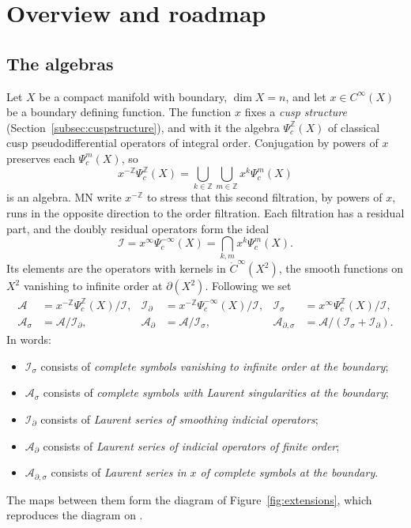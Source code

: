 \documentclass[11pt,oneside,reqno]{article}
\newcommand{\Z}{\mathbb Z}
\newcommand{\cA}{\mathcal A}
\newcommand{\cI}{\mathcal I}
\newcommand{\Is}{\mathcal I_\sigma}
\newcommand{\Id}{\mathcal I_\partial}
\newcommand{\As}{\mathcal A_\sigma}
\newcommand{\Ad}{\mathcal A_\partial}
\newcommand{\Ads}{\mathcal A_{\partial,\sigma}}
\newcommand{\Psic}{\Psi_{c}}
\newcommand{\CI}{C^\infty}
\newcommand{\dCI}{\dot C^\infty}
\theoremstyle{plain}
\theoremstyle{definition}
\theoremstyle{remark}
\begin{document}
\section{Overview and roadmap}\label{sec:overview}

\subsection{The algebras}\label{subsec:algebras}
Let \(X\) be a compact manifold with boundary, \(\dim X=n\), and let
\(x\in\CI(X)\) be a boundary defining function. The function \(x\) fixes a
\emph{cusp structure} (Section~\ref{subsec:cuspstructure}), and with it the
algebra \(\Psic^{\Z}(X)\) of classical cusp pseudodifferential operators of
integral order. Conjugation by powers of \(x\) preserves each
\(\Psic^m(X)\), so
\[
 x^{-\Z}\Psic^{\Z}(X)=\bigcup_{k\in\Z}\bigcup_{m\in\Z}x^k\Psic^m(X)
\]
is an algebra. MN write \(x^{-\Z}\) to stress that this second
filtration, by powers of \(x\), runs in the opposite direction to the
order filtration. Each filtration has a residual part, and the doubly
residual operators form the ideal
\[
 \cI=x^\infty\Psic^{-\infty}(X)=\bigcap_{k,m}x^k\Psic^m(X).
\]
Its elements are the operators with kernels in \(\dCI(X^2)\), the smooth
functions on \(X^2\) vanishing to infinite order at \(\partial(X^2)\).
Following \cite[(8)--(10)]{MN} we set
\begin{align*}
 \cA&=x^{-\Z}\Psic^{\Z}(X)/\cI,&
 \Id&=x^{-\Z}\Psic^{-\infty}(X)/\cI,&
 \Is&=x^{\infty}\Psic^{\Z}(X)/\cI,\\
 \As&=\cA/\Id,&
 \Ad&=\cA/\Is,&
 \Ads&=\cA/(\Is+\Id).
\end{align*}
In words:
\begin{itemize}
\item \(\Is\) consists of \emph{complete symbols vanishing to infinite order
at the boundary};
\item \(\As\) consists of \emph{complete symbols with Laurent singularities at
the boundary};
\item \(\Id\) consists of \emph{Laurent series of smoothing indicial
operators};
\item \(\Ad\) consists of \emph{Laurent series of indicial operators of finite
order};
\item \(\Ads\) consists of \emph{Laurent series in \(x\) of complete symbols at
the boundary}.
\end{itemize}
The maps between them form the diagram of
Figure~\ref{fig:extensions}, which reproduces the diagram on
\cite[p.~4]{MN}.
\end{document}
